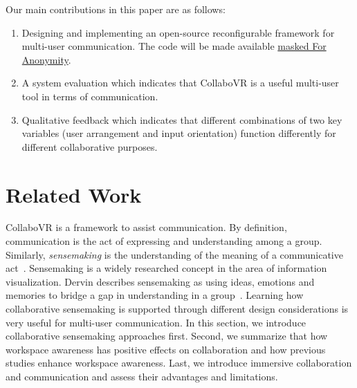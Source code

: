 \documentclass{sigchi}
\begin{document}
Our main contributions in this paper are as follows:
\begin{enumerate}
    \item Designing and implementing an open-source reconfigurable framework for multi-user communication. The code will be made available \url{masked For Anonymity}.
    \item A system evaluation which indicates that CollaboVR is a useful multi-user tool in terms of communication.
    \item Qualitative feedback which indicates that different combinations of two key variables (user arrangement and input orientation) function differently for different collaborative purposes.
\end{enumerate}


\section{Related Work}
CollaboVR is a framework to assist communication. By definition, communication is the act of expressing and understanding among a group. Similarly, \textit{sensemaking} is the understanding of the meaning of a communicative act~\cite{paul2009understanding}. Sensemaking is a widely researched concept in the area of information visualization. Dervin describes sensemaking as using ideas, emotions and memories to bridge a gap in understanding in a group~\cite{dervin1992mind}. Learning how collaborative sensemaking is supported through different design considerations is very useful for multi-user communication. In this section, we introduce collaborative sensemaking approaches first. Second, we summarize that how workspace awareness has positive effects on collaboration and how previous studies enhance workspace awareness. Last, we introduce immersive collaboration and communication and assess their advantages and limitations.
\end{document}
